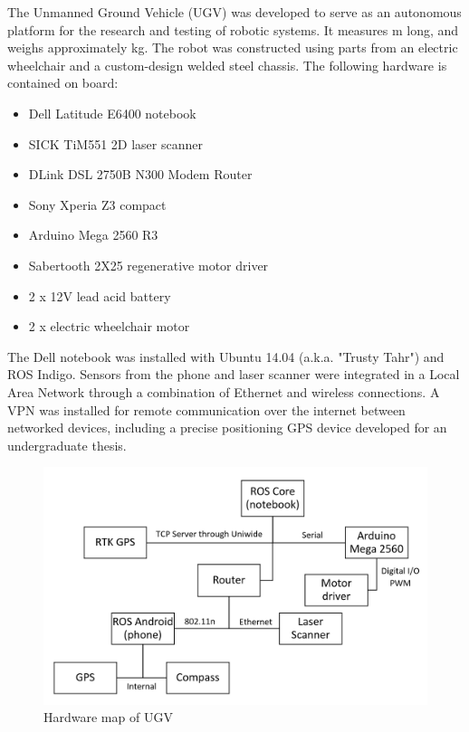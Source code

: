 \documentclass[titlepage,12pt,a4paper]{article}
\begin{document}
The Unmanned Ground Vehicle (UGV) was developed to serve as an autonomous platform for the research and testing of robotic systems. It measures \unit[1]{m} long, and weighs approximately \unit[50]{kg}. The robot was constructed using parts from an electric wheelchair and a custom-design welded steel chassis. The following hardware is contained on board:
\begin{itemize}
	\item Dell Latitude E6400 notebook
	\item SICK TiM551 2D laser scanner
	\item DLink DSL 2750B N300 Modem Router
	\item Sony Xperia Z3 compact
	\item Arduino Mega 2560 R3
	\item Sabertooth 2X25 regenerative motor driver
	\item 2 x 12V lead acid battery
	\item 2 x electric wheelchair motor
\end{itemize}

The Dell notebook was installed with Ubuntu 14.04 (a.k.a. "Trusty Tahr") and ROS Indigo. Sensors from the phone and laser scanner were integrated in a Local Area Network through a combination of Ethernet and wireless connections. A VPN was installed for remote communication over the internet between networked devices, including a precise positioning GPS device developed for an undergraduate thesis.

\begin{figure}[h!]
	\centering
	\includegraphics[scale=0.6]{figures/hardware_chart.png}
	\caption{Hardware map of UGV}
	\label{figure:hardware_chart}
\end{figure}
\pagebreak
\end{document}
